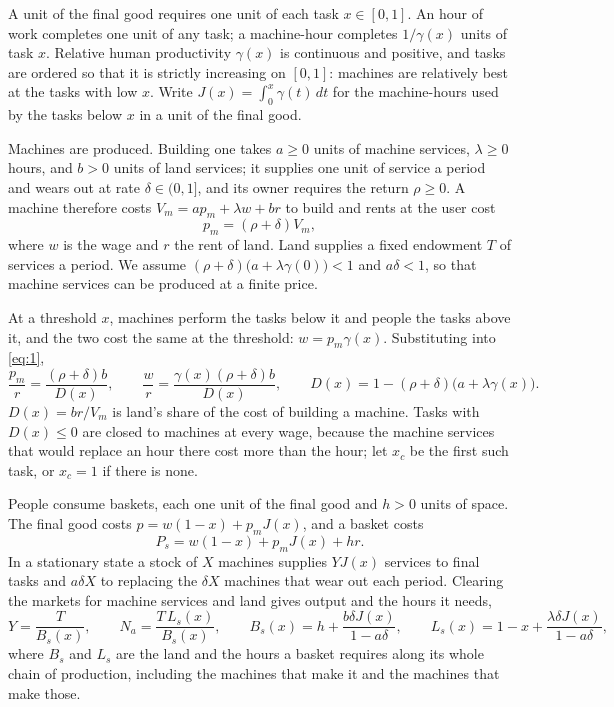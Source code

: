 \documentclass[12pt]{article}
\theoremstyle{plain}
\begin{document}
A unit of the final good requires one unit of each task $x\in[0,1]$. An hour of work completes one unit of any task; a machine-hour completes $1/\gamma(x)$ units of task $x$. Relative human productivity $\gamma(x)$ is continuous and positive, and tasks are ordered so that it is strictly increasing on $[0,1]$: machines are relatively best at the tasks with low $x$. Write $J(x)=\int_0^x\gamma(t)\,dt$ for the machine-hours used by the tasks below $x$ in a unit of the final good.

Machines are produced. Building one takes $a\ge0$ units of machine services, $\lambda\ge0$ hours, and $b>0$ units of land services; it supplies one unit of service a period and wears out at rate $\delta\in(0,1]$, and its owner requires the return $\rho\ge0$. A machine therefore costs $V_m=ap_m+\lambda w+br$ to build and rents at the user cost
\begin{equation}\label{eq:1}
p_m=(\rho+\delta)V_m,
\end{equation}
where $w$ is the wage and $r$ the rent of land. Land supplies a fixed endowment $T$ of services a period. We assume $(\rho+\delta)\bigl(a+\lambda\gamma(0)\bigr)<1$ and $a\delta<1$, so that machine services can be produced at a finite price.

At a threshold $x$, machines perform the tasks below it and people the tasks above it, and the two cost the same at the threshold: $w=p_m\gamma(x)$. Substituting into \eqref{eq:1},
\begin{equation}\label{eq:2}
\frac{p_m}{r}=\frac{(\rho+\delta)b}{D(x)},\qquad
\frac{w}{r}=\frac{\gamma(x)(\rho+\delta)b}{D(x)},\qquad
D(x)=1-(\rho+\delta)\bigl(a+\lambda\gamma(x)\bigr).
\end{equation}
$D(x)=br/V_m$ is land's share of the cost of building a machine. Tasks with $D(x)\le0$ are closed to machines at every wage, because the machine services that would replace an hour there cost more than the hour; let $x_c$ be the first such task, or $x_c=1$ if there is none.

People consume baskets, each one unit of the final good and $h>0$ units of space. The final good costs $p=w(1-x)+p_mJ(x)$, and a basket costs
\begin{equation}\label{eq:3}
P_s=w(1-x)+p_mJ(x)+hr.
\end{equation}
In a stationary state a stock of $X$ machines supplies $YJ(x)$ services to final tasks and $a\delta X$ to replacing the $\delta X$ machines that wear out each period. Clearing the markets for machine services and land gives output and the hours it needs,
\begin{equation}\label{eq:4}
Y=\frac{T}{B_s(x)},\qquad N_a=\frac{T\,L_s(x)}{B_s(x)},\qquad
B_s(x)=h+\frac{b\delta J(x)}{1-a\delta},\qquad L_s(x)=1-x+\frac{\lambda\delta J(x)}{1-a\delta},
\end{equation}
where $B_s$ and $L_s$ are the land and the hours a basket requires along its whole chain of production, including the machines that make it and the machines that make those.
\end{document}
